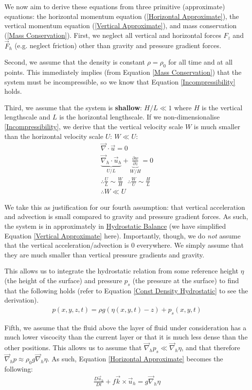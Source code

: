 We now aim to derive these equations from three primitive (approximate) equations: the horizontal momentum equation (\ref{Horizontal Approximate}), the vertical momentum equation (\ref{Vertical Approximate}), and mass conservation (\ref{Mass Conservation}). First, we neglect all vertical and horizontal forces $F_z$ and $\vec{F}_h$ (e.g. neglect friction) other than gravity and pressure gradient forces.

Second, we assume that the density is constant $\rho=\rho_0$ for all time and at all points. This immediately implies (from Equation \ref{Mass Conservation}) that the system must be incompressible, so we know that Equation \ref{Incompressibility} holds.

Third, we assume that the system is \textbf{shallow}: $H/L\ll 1$ where $H$ is the vertical lengthscale and $L$ is the horizontal lengthscale. If we non-dimensionalise \ref{Incompressibility}, we derive that the vertical velocity scale $W$ is much smaller than the horizontal velocity scale $U$: $W\ll U$:
\begin{align*}
    \vec{\nabla}\cdot\vec{u}=0\\
    \underbrace{\vec{\nabla}_h\cdot\vec{u}_h}_{U/L}+\underbrace{\frac{\partial w}{\partial z}}_{W/H}=0\\
    \therefore \frac{U}{L}\sim\frac{W}{H}\text{   }\therefore
    \frac{W}{U}\sim\frac{H}{L}\\
    \therefore \boxed{W \ll U}
\end{align*}

We take this as justification for our fourth assumption: that vertical acceleration and advection is small compared to gravity and pressure gradient forces. As such, the system is in approximately in \hyperref[Hydrostatic GFD]{Hydrostatic Balance} (we have simplified Equation \ref{Vertical Approximate} here). Importantly, though, we do \textit{not} assume that the vertical acceleration/advection is $0$ everywhere. We simply assume that they are much smaller than vertical pressure gradients and gravity.

This allows us to integrate the hydrostatic relation from some reference height $\eta$ (the height of the surface) and pressure $p_s$ (the pressure at the surface) to find that the following holds (refer to Equation \ref{Const Density Hydrostatic} to see the derivation).
\begin{align*}
    p(x,y,z,t)=\rho g(\eta(x,y,t)-z)+p_s(x,y,t)
\end{align*}

Fifth, we assume that the fluid above the layer of fluid under consideration has a much lower viscocity than the current layer or that it is much less dense than the other positions. This allows us to assume that $\vec{\nabla}_hp_s\ll \vec{\nabla}_h\eta$, and that therefore $\vec{\nabla}_h p \approx \rho_0 g \vec{\nabla}_h \eta$. As such, Equation \ref{Horizontal Approximate} becomes the following:
\begin{align*}
    \frac{D\vec{u}_h}{Dt}+f\vec{k}\times\vec{u}_h=g\vec{\nabla}_h\eta
\end{align*}

